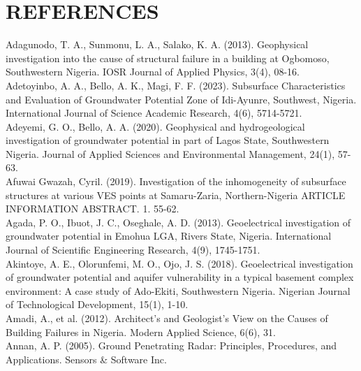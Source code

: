 \documentclass[12pt,a4paper]{report}
\begin{document}
\chapter*{REFERENCES}
\begin{justify}
\setlength{\parindent}{0pt}

    Adagunodo, T. A., Sunmonu, L. A., Salako, K. A. (2013). Geophysical investigation into the cause of structural failure in a building at Ogbomoso, Southwestern Nigeria. IOSR Journal of Applied Physics, 3(4), 08-16. \\
    
    Adetoyinbo, A. A., Bello, A. K., Magi, F. F. (2023). Subsurface Characteristics and Evaluation of Groundwater Potential Zone of Idi-Ayunre, Southwest, Nigeria. International Journal of Science Academic Research, 4(6), 5714-5721. \\
    
    Adeyemi, G. O., Bello, A. A. (2020). Geophysical and hydrogeological investigation of groundwater potential in part of Lagos State, Southwestern Nigeria. Journal of Applied Sciences and Environmental Management, 24(1), 57-63. \\
    
    Afuwai Gwazah, Cyril. (2019). Investigation of the inhomogeneity of subsurface structures at various VES points at Samaru-Zaria, Northern-Nigeria ARTICLE INFORMATION ABSTRACT. 1. 55-62. \\

    Agada, P. O., Ibuot, J. C., Oseghale, A. D. (2013). Geoelectrical investigation of groundwater potential in Emohua LGA, Rivers State, Nigeria. International Journal of Scientific Engineering Research, 4(9), 1745-1751. \\
    
    Akintoye, A. E., Olorunfemi, M. O., Ojo, J. S. (2018). Geoelectrical investigation of groundwater potential and aquifer vulnerability in a typical basement complex environment: A case study of Ado-Ekiti, Southwestern Nigeria. Nigerian Journal of Technological Development, 15(1), 1-10. \\
    
    Amadi, A., et al. (2012). Architect's and Geologist's View on the Causes of Building Failures in Nigeria. Modern Applied Science, 6(6), 31. \\
    
    Annan, A. P. (2005). Ground Penetrating Radar: Principles, Procedures, and Applications. Sensors \& Software Inc.


\end{justify}
\end{document}
